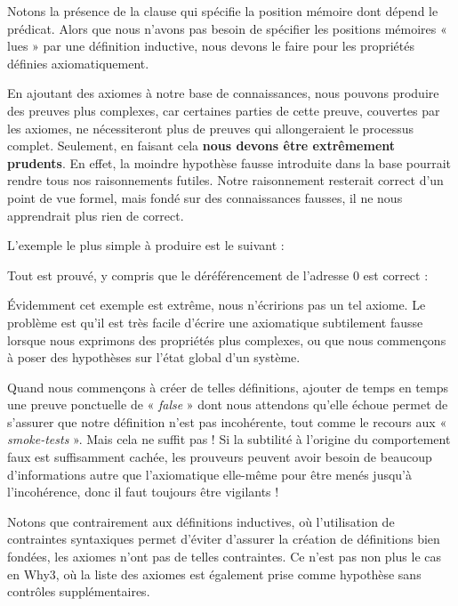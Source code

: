 

Notons la présence de la clause  qui spécifie la
position mémoire dont dépend le prédicat. Alors que nous n'avons pas besoin de
spécifier les positions mémoires « lues » par une définition inductive, nous
devons le faire pour les propriétés définies axiomatiquement.




En ajoutant des axiomes à notre base de connaissances, nous pouvons produire des
preuves plus complexes, car certaines parties de cette preuve, couvertes par
les axiomes, ne nécessiteront plus de preuves qui allongeraient le processus
complet. Seulement, en faisant cela \textbf{nous devons être extrêmement prudents}.
En effet, la moindre hypothèse fausse introduite dans la base pourrait rendre
tous nos raisonnements futiles. Notre raisonnement resterait correct d'un point
de vue formel, mais fondé sur des connaissances fausses, il ne nous apprendrait
plus rien de correct.



L'exemple le plus simple à produire est le suivant :






Tout est prouvé, y compris que le déréférencement de l'adresse 0 est correct :





Évidemment cet exemple est extrême, nous n'écririons pas un tel axiome. Le
problème est qu'il est très facile d'écrire une axiomatique subtilement fausse
lorsque nous exprimons des propriétés plus complexes, ou que nous commençons à
poser des hypothèses sur l'état global d'un système.



Quand nous commençons à créer de telles définitions, ajouter de temps en
temps une preuve ponctuelle de « \textit{false} » dont nous attendons qu'elle échoue permet
de s'assurer que notre définition n'est pas incohérente, tout comme le recours aux
« \textit{smoke-tests} ». Mais cela ne suffit pas ! Si la subtilité à l'origine
du comportement faux est suffisamment cachée, les prouveurs peuvent avoir besoin
de beaucoup d'informations autre que l'axiomatique elle-même pour être menés
jusqu'à l'incohérence, donc il faut toujours être vigilants !


Notons que contrairement aux définitions inductives, où l'utilisation de
contraintes syntaxiques permet d'éviter d'assurer la création de définitions
bien fondées, les axiomes n'ont pas de telles contraintes. Ce n'est pas non plus
le cas en Why3, où la liste des axiomes est également prise comme hypothèse sans
contrôles supplémentaires.



